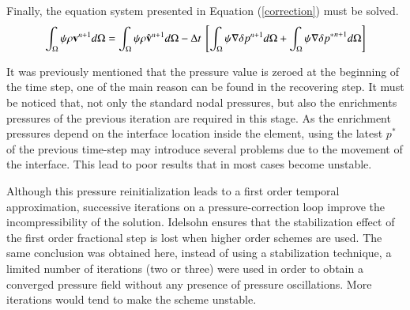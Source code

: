 Finally, the equation system presented in Equation (\ref{correction}) must be solved.
 \begin{equation}
  \int_{\Omega} \psi \rho \vv^{n+1} d\Omega = \int_{\Omega} \psi \rho \hat{\vv}^{n+1} d\Omega - \Delta t \ \left[\int_{\Omega} \psi \nabla \delta p^{n+1} d\Omega + \int_{\Omega} \psi \nabla \delta {p^*}^{n+1} d\Omega \right]
  \label{correction}
 \end{equation}

It was previously mentioned that the pressure value is zeroed at the beginning of the time step, one of the main reason can be found in the recovering step. It must be noticed that, not only the standard nodal pressures, but also the enrichments pressures of the previous iteration are required in this stage. As the enrichment pressures depend on the interface location inside the element, using the latest $p^*$ of the previous time-step may introduce several problems due to the movement of the interface. This lead to poor results that in most cases become unstable.

Although this pressure reinitialization leads to a first order temporal approximation, successive iterations on a pressure-correction loop improve the incompressibility of the solution. Idelsohn\cite{Idelsohn13c} ensures that the stabilization effect of the first order fractional step is lost when higher order schemes are used. The same conclusion was obtained here, instead of using a stabilization technique, a limited number of iterations (two or three) were used in order to obtain a converged pressure field without any presence of pressure oscillations. More iterations would tend to make the scheme unstable. 
